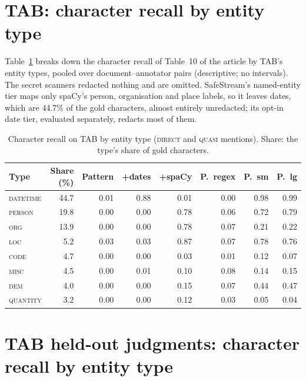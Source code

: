 \documentclass[11pt,a4paper]{article}
\begin{document}
\section{TAB: character recall by entity type}\label{s:tab}

Table~\ref{t:tab} breaks down the character recall of Table~10 of the article by TAB's entity types, pooled over document--annotator pairs (descriptive; no intervals). The secret scanners redacted nothing and are omitted. SafeStream's named-entity tier maps only spaCy's person, organisation and place labels, so it leaves dates, which are 44.7\% of the gold characters, almost entirely unredacted; its opt-in date tier, evaluated separately, redacts most of them.

\begin{table}[ht]
\caption{Character recall on TAB by entity type (\textsc{direct} and \textsc{quasi} mentions). Share: the type's share of gold characters.}\label{t:tab}
\small
\setlength{\tabcolsep}{4pt}
\begin{tabular*}{\textwidth}{@{\extracolsep\fill}lrrrrrrr}
\toprule
Type & Share (\%) & Pattern & +dates & +spaCy & P.\ regex & P.\ sm & P.\ lg \\
\midrule
\textsc{datetime} & 44.7 & 0.01 & 0.88 & 0.01 & 0.00 & 0.98 & 0.99 \\
\textsc{person} & 19.8 & 0.00 & 0.00 & 0.78 & 0.06 & 0.72 & 0.79 \\
\textsc{org} & 13.9 & 0.00 & 0.00 & 0.78 & 0.07 & 0.21 & 0.22 \\
\textsc{loc} & 5.2 & 0.03 & 0.03 & 0.87 & 0.07 & 0.78 & 0.76 \\
\textsc{code} & 4.7 & 0.00 & 0.00 & 0.03 & 0.01 & 0.12 & 0.07 \\
\textsc{misc} & 4.5 & 0.00 & 0.01 & 0.10 & 0.08 & 0.14 & 0.15 \\
\textsc{dem} & 4.0 & 0.00 & 0.00 & 0.15 & 0.07 & 0.44 & 0.47 \\
\textsc{quantity} & 3.2 & 0.00 & 0.00 & 0.12 & 0.03 & 0.05 & 0.04 \\
\bottomrule
\end{tabular*}
\end{table}

\section{TAB held-out judgments: character recall by entity type}\label{s:tabtrain}
\end{document}
